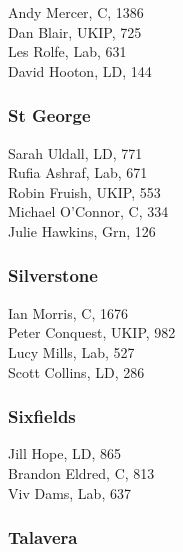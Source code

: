 \documentclass[a4paper,openany,10pt]{book}
\begin{document}


Andy Mercer, C, 1386\\
Dan Blair, UKIP, 725\\
Les Rolfe, Lab, 631\\
David Hooton, LD, 144\\


\subsubsection*{St George}



Sarah Uldall, LD, 771\\
Rufia Ashraf, Lab, 671\\
Robin Fruish, UKIP, 553\\
Michael O'Connor, C, 334\\
Julie Hawkins, Grn, 126\\


\subsubsection*{Silverstone}



Ian Morris, C, 1676\\
Peter Conquest, UKIP, 982\\
Lucy Mills, Lab, 527\\
Scott Collins, LD, 286\\


\subsubsection*{Sixfields}



Jill Hope, LD, 865\\
Brandon Eldred, C, 813\\
Viv Dams, Lab, 637\\


\subsubsection*{Talavera}

\end{document}
